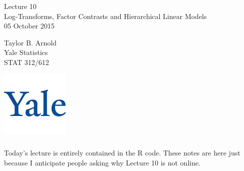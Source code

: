 



\begin{frame}[fragile] \frametitle{}

\vfill

{\fontsize{0.7cm}{0cm}\selectfont Lecture 10 \\\vspace{0.2cm}
Log-Transforms, Factor Contrasts and Hierarchical Linear Models}\\\vspace{0.5cm}
05 October 2015

\vspace{2cm}

\begin{minipage}{0.6\textwidth}
Taylor B. Arnold \\
Yale Statistics \\
STAT 312/612
\end{minipage}
\hfill
\begin{minipage}{0.3\textwidth}\raggedleft
\includegraphics[scale=0.3]{../yale-logo.png}
\end{minipage}%

\end{frame}

\begin{frame}[fragile] \frametitle{}

Today's lecture is entirely contained in the R code.
These notes are here just because I anticipate people
asking why Lecture 10 is not online.

\end{frame}















